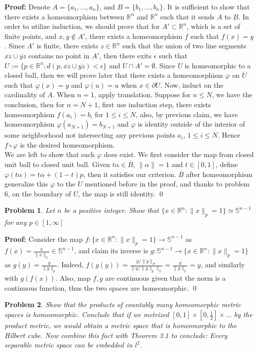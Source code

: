 \documentclass[12pt]{article}
\newtheorem{problem}{Problem}
\begin{document}
\textbf{Proof:} Denote $A=\{a_{1}, \dots, a_{n}\}$, and $B=\{b_{1}, \dots, b_{n}\}$. It is sufficient to show that there exists a homeomorphism between $\mathbb{R}^{n}$ and $\mathbb{R}^{n}$ such that it sends $A$ to $B$. In order to utilize induction, we should prove that for $A'\subset\mathbb{R}^{n}$, which is a set of finite points, and $x,y\notin A'$, there exists a homeomorphism $f$ such that $f(x)=y$. Since $A'$ is finite, there exists $z\in \mathbb{R}^{n}$ such that the union of two line segments $\overline{xz}\cup\overline{yz}$ contains no point in $A'$, then there exits $\epsilon$ such that $U:=\{p\in \mathbb{R}^{n}: d(p, \overline{xz}\cup\overline{yz})<\epsilon\}$ and $U\cap A'=\emptyset$. Since $\overline{U}$ is homeomorphic to a closed ball, then we will prove later that there exists a homeomorphism $\varphi$ on $\overline{U}$ such that $\varphi(x)=y$ and $\varphi(u)=u$ when $x\in \partial U$. Now, induct on the cardinality of $A$. When $n=1$, apply translation. Suppose for $n\leq N$, we have the conclusion, then for $n=N+1$, first use induction step, there exists homeomorphism $f(a_{i})=b_{i}$ for $1\leq i\leq N$, also, by previous claim, we have homeomorphism $\varphi(a_{N+1})=b_{N+1}$ and $\varphi$ is identity outside of the interior of some neighborhood not intersecting any previous points $a_{i}$, $1\leq i\leq N$. Hence $f\circ \varphi$ is the desired homeomorphism. \\
\indent We are left to show that such $\varphi$ does exist. We first consider the map from closed unit ball to closed unit ball. Given $t\alpha\in \overline{B}$, $\|\alpha\|=1$ and $t\in [0, 1]$, define $\varphi(t\alpha)=t\alpha+(1-t)p$, then it satisfies our criterion. $\overline{B}$ after homeomorphism generalize this $\varphi$ to the $U$ mentioned before in the proof, and thanks to problem 6, on the boundary of $U$, the map is still identity. \qed
\\
\begin{problem}
Let $n$ be a positive integer. Show that $\{x\in\mathbb{R}^{n}: \|x\|_{p}=1\}\simeq \mathbb{S}^{n-1}$ for any $p\in[1, \infty]$
\end{problem}

\textbf{Proof:} Consider the map $f: \{x\in\mathbb{R}^{n}: \|x\|_{p}=1\} \to \mathbb{S}^{n-1}$ as $f(x)=\frac{x}{\|x\|_{2}}\in \mathbb{S}^{n-1}$, and claim its inverse is 
 $g: \mathbb{S}^{n-1}\to \{x\in\mathbb{R}^{n}: \|x\|_{p}=1\}$ as $g(y)=\frac{y}{\|y\|_{p}}$. Indeed, $f(g(y))=\frac{y/\|y\|_{P}}{\|y/\|y\|_{p}\|_{2}}=\frac{y}{\|y\|_{2}}=y$, and similarly with $g(f(x))$. Also, map $f,g$ are continuous given that the norm is a continuous function, thus the two spaces are homeomorphic. \qed
\\
\begin{problem}
Show that the products of countably many homeomorphic metric spaces is homeomorphic. Conclude that if we metrized $[0,1]\times [0,\frac{1}{2}]\times \dots$ by the product metric, we would obtain a metric space that is homeomorphic to the Hilbert cube. Now combine this fact with Theorem 3.1 to conclude: Every separable metric space can be embedded in $l^{2}$.
\end{problem}
\end{document}
